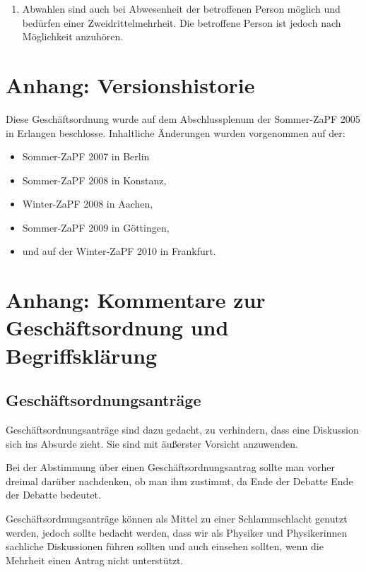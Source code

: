 \documentclass[draft,12pt,oneside]{scrreprt}
\begin{document}
\begin{enumerate}
\item Abwahlen sind auch bei Abwesenheit der betroffenen Person möglich und
      bedürfen einer Zweidrittelmehrheit.
      Die betroffene Person ist jedoch nach Möglichkeit anzuhören.
\end{enumerate}

\section*{Anhang: Versionshistorie}

Diese Geschäftsordnung wurde auf dem Abschlussplenum der Sommer-ZaPF 2005 in
Erlangen beschlosse.
Inhaltliche Änderungen wurden vorgenommen auf der:

\begin{itemize}

\item Sommer-ZaPF 2007 in Berlin

\item Sommer-ZaPF 2008 in Konstanz,

\item Winter-ZaPF 2008 in Aachen,

\item Sommer-ZaPF 2009 in Göttingen,

\item und auf der Winter-ZaPF 2010 in Frankfurt.

\end{itemize}

\section*{Anhang: Kommentare zur Geschäftsordnung und Begriffsklärung}

\subsection*{Geschäftsordnungsanträge}

Geschäftsordnungsanträge sind dazu gedacht, zu verhindern, dass eine Diskussion
sich ins Absurde zieht. Sie sind mit äußerster Vorsicht anzuwenden.

Bei der Abstimmung über einen Geschäftsordnungsantrag sollte man vorher dreimal
darüber nachdenken, ob man ihm zustimmt, da Ende der Debatte Ende der Debatte
bedeutet.

Geschäftsordnungsanträge können als Mittel zu einer Schlammschlacht genutzt
werden, jedoch sollte bedacht werden, dass wir als Physiker und Physikerinnen
sachliche Diskussionen führen sollten und auch einsehen sollten, wenn die
Mehrheit einen Antrag nicht unterstützt.
\end{document}
